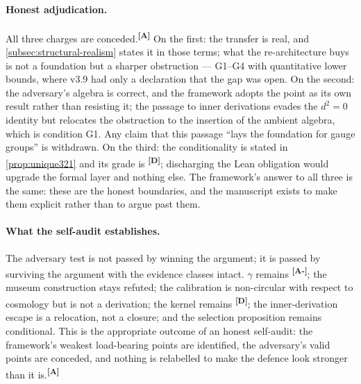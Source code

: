 \documentclass[12pt,a4paper,twoside]{article}
\theoremstyle{plain}
\theoremstyle{definition}
\theoremstyle{remark}
\newcommand{\catmark}[1]{\textsuperscript{\textsf{\textbf{[#1]}}}}
\begin{document}
\paragraph{Honest adjudication.}
All three charges are conceded.\catmark{A} On the first: the transfer is
real, and \cref{subsec:structural-realism} states it in those terms; what
the re-architecture buys is not a foundation but a sharper obstruction
--- G1--G4 with quantitative lower bounds, where v3.9 had only a
declaration that the gap was open. On the second: the adversary's algebra
is correct, and the framework adopts the point as its own result rather
than resisting it; the passage to inner derivations evades the $d^2=0$
identity but relocates the obstruction to the insertion of the ambient
algebra, which is condition G1. Any claim that this passage ``lays the
foundation for gauge groups'' is withdrawn. On the third: the
conditionality is stated in \cref{prop:unique321} and its grade is
\catmark{D}; discharging the Lean obligation would upgrade the formal
layer and nothing else. The framework's answer to all three is the same:
these are the honest boundaries, and the manuscript exists to make them
explicit rather than to argue past them.

\paragraph{What the self-audit establishes.}
The adversary test is not passed by winning the argument; it is passed by
surviving the argument with the evidence classes intact. $\gamma$ remains
\catmark{A-}; the museum construction stays refuted; the calibration is
non-circular with respect to cosmology but is not a derivation; the
kernel remains \catmark{D}; the inner-derivation escape is a relocation,
not a closure; and the selection proposition remains conditional. This is
the appropriate outcome of an honest self-audit: the framework's weakest
load-bearing points are identified, the adversary's valid points are
conceded, and nothing is relabelled to make the defence look stronger
than it is.\catmark{A}
\end{document}

